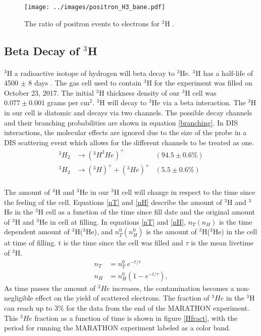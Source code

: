 \begin{figure}[t]
	\centering

	\texttt{[image: ../images/positron\_H3\_bane.pdf]}
	
	\caption{The ratio of positron events to electrons for $^3$H \cite{tongsu}. }
	\label{PC}
\end{figure}

\subsection{Beta Decay of $^3$H}
\paragraph{} $^3$H a radioactive isotope of hydrogen will beta decay to $^3$He. $^3$H has a half-life of 4500 $\pm$ 8 days \cite{T2HL}. The gas cell used to contain $^3$H for the experiment was filled on October 23, 2017. The initial $^3$H thickness density of our $^3$H cell was $0.077 \pm 0.001 $ grams per cm$^2$. $^3$H will decay to $^3$He via a beta interaction. The $^3$H in our cell is diatomic and decays via two channels\cite{diaT}. The possible decay channels and their branching probabilities are shown in equation \ref{branching}. In DIS interactions, the molecular effects are ignored due to the size of the probe in a DIS scattering event which allows for the different channels to be treated as one. 
\begin{align}
			^3H_2 &\rightarrow(^3H ^3He)^+  &(94.5 \pm 0.6\%) \nonumber \\ 
			^3H_2 &\rightarrow(^3H)^+ + (^3He)^+  & (5.5 \pm 0.6\%) 
			\label{branching}
\end{align}
\paragraph{}The amount of $^3$H and $^3$He in our $^3$H cell will change in respect to the time since the feeling of the cell. Equations \ref{nT} and \ref{nH} describe the amount of $^3$H and $^3$He in the $^3$H cell as a function of the time since fill date and the original amount of $^3$H and $^3$He in cell at filling. In equations \ref{nT} and \ref{nH}, $n_T(n_H)$ is the time dependent amount of $^3$H($^3$He), and  $n_T^0(n_H^0)$ is the amount of $^3$H($^3$He) in the cell at time of filling. t is the time since the cell was filled and $\tau$ is the mean livetime of $^3$H.
\begin{align}
	n_T &= n_T^0 \: e^{-t/\tau} \label{nT}\\
	n_H &= n_H^0(1 - e^{-t/\tau}) \label{nH},
\end{align}
As time passes the amount of $^3He$ increases, the contamination becomes a non-negligible effect on the yield of scattered electrons. The fraction of $^3He$ in the $^3$H can reach up to 3$\%$ for the data from the end of the MARATHON experiment. This $^3He$ fraction as a function of time is shown in figure \ref{Hfract}, with the period for running the MARATHON experiment labeled as a color band. 

